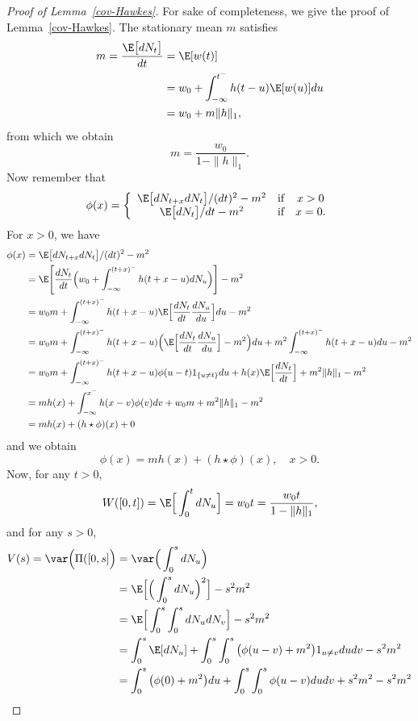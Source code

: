 \documentclass[aos]{imsart}
\theoremstyle{plain}
\theoremstyle{remark}
\newcommand{\1}{1}
\begin{document}
\begin{proof}[Proof of Lemma~\ref{cov-Hawkes}]
For sake of completeness, we give the proof of Lemma~\ref{cov-Hawkes}. The stationary mean $m$ satisfies
\begin{align*}
m=\frac{\E\big[dN_t\big]}{dt}&=\E[w(t)]\\
&=w_0+\int_{-\infty}^{t^-}h(t-u)\E[w(u)]du\\
&=w_0+m\|h\|_1,
\end{align*}
from which we obtain
$$m=\frac{w_0}{1-\|h\|_1}.$$
Now remember that
$$\phi(x)=\left\{\begin{array}{ccc}
\E\big[dN_{t+x}dN_t\big]/(dt)^2- m^2&\mbox{if}   &x>0   \\
\E\big[dN_t\big]/dt- m^2&\mbox{if}   &x=0.  
 \end{array}
\right.$$
For $x>0$, we have
\begin{align*}
\phi(x)&=\E\big[dN_{t+x}dN_t\big]/(dt)^2- m^2\\
&=\E\Bigg[\frac{dN_t}{dt}\Big(w_0+\int_{-\infty}^{(t+x)^-}h(t+x-u)dN_u\Big)\Bigg]-m^2\\
&=w_0m+\int_{-\infty}^{(t+x)^-}h(t+x-u)\E\Big[\frac{dN_t}{dt}\frac{dN_u}{du}\Big]du-m^2\\
&=w_0m+\int_{-\infty}^{(t+x)^-}h(t+x-u)\Big(\E\Big[\frac{dN_t}{dt}\frac{dN_u}{du}\Big]-m^2\Big)du+m^2\int_{-\infty}^{(t+x)^-}h(t+x-u)du-m^2\\
&=w_0m+\int_{-\infty}^{(t+x)^-}h(t+x-u)\phi(u-t)1_{\{u\not=t\}}du+h(x)\E\Big[\frac{dN_t}{dt}\Big]+m^2\|h\|_1-m^2\\
&=m h(x)+\int_{-\infty}^{x^-}h(x-v)\phi(v)dv+w_0m+m^2\|h\|_1-m^2\\
&=m h(x)+(h\star\phi)(x)+0
\end{align*}
and we obtain 
\begin{equation}
\phi(x)=m h(x)+(h\star\phi)(x),\quad x>0.
\end{equation}
Now, for any $t>0$,
$$W([0,t])=\E\Big[\int_0^tdN_u\Big]=w_0 t=\frac{w_0 t}{1-\|h\|_1},$$
and for any $s>0$,
\begin{align*}
V(s)=\var\Big(\Pi([0,s]\Big)&=\var\Big(\int_0^sdN_u\Big)\\
&=\E\Big[\Big(\int_0^sdN_u\Big)^2\Big]-s^2m^2\\
&=\E\Big[\int_0^s\int_0^sdN_udN_v\Big]-s^2m^2\\
&=\int_0^s\E[dN_u]+\int_0^s\int_0^s\big(\phi(u-v)+m^2\big)1_{u\not=v}dudv-s^2m^2\\
&=\int_0^s\big(\phi(0)+m^2\big)du+\int_0^s\int_0^s\phi(u-v)dudv+s^2m^2-s^2m^2\\

\end{align*}
\end{proof}
\end{document}
